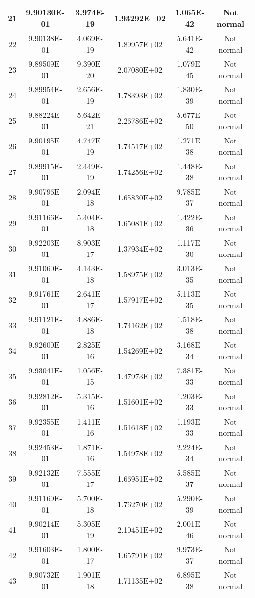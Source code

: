 \begin{table}[h]
\begin{tabular}{|c|c|c|c|c|c|}
		21 & 9.90130E-01 & 3.974E-19 & 1.93292E+02 & 1.065E-42 & Not normal\\\hline
		22 & 9.90138E-01 & 4.069E-19 & 1.89957E+02 & 5.641E-42 & Not normal\\\hline
		23 & 9.89509E-01 & 9.390E-20 & 2.07080E+02 & 1.079E-45 & Not normal\\\hline
		24 & 9.89954E-01 & 2.656E-19 & 1.78393E+02 & 1.830E-39 & Not normal\\\hline
		25 & 9.88224E-01 & 5.642E-21 & 2.26786E+02 & 5.677E-50 & Not normal\\\hline
		26 & 9.90195E-01 & 4.747E-19 & 1.74517E+02 & 1.271E-38 & Not normal\\\hline
		27 & 9.89915E-01 & 2.449E-19 & 1.74256E+02 & 1.448E-38 & Not normal\\\hline
		28 & 9.90796E-01 & 2.094E-18 & 1.65830E+02 & 9.785E-37 & Not normal\\\hline
		29 & 9.91166E-01 & 5.404E-18 & 1.65081E+02 & 1.422E-36 & Not normal\\\hline
		30 & 9.92203E-01 & 8.903E-17 & 1.37934E+02 & 1.117E-30 & Not normal\\\hline
		31 & 9.91060E-01 & 4.143E-18 & 1.58975E+02 & 3.013E-35 & Not normal\\\hline
		32 & 9.91761E-01 & 2.641E-17 & 1.57917E+02 & 5.113E-35 & Not normal\\\hline
		33 & 9.91121E-01 & 4.886E-18 & 1.74162E+02 & 1.518E-38 & Not normal\\\hline
		34 & 9.92600E-01 & 2.825E-16 & 1.54269E+02 & 3.168E-34 & Not normal\\\hline
		35 & 9.93041E-01 & 1.056E-15 & 1.47973E+02 & 7.381E-33 & Not normal\\\hline
		36 & 9.92812E-01 & 5.315E-16 & 1.51601E+02 & 1.203E-33 & Not normal\\\hline
		37 & 9.92355E-01 & 1.411E-16 & 1.51618E+02 & 1.193E-33 & Not normal\\\hline
		38 & 9.92453E-01 & 1.871E-16 & 1.54978E+02 & 2.224E-34 & Not normal\\\hline
		39 & 9.92132E-01 & 7.555E-17 & 1.66951E+02 & 5.585E-37 & Not normal\\\hline
		40 & 9.91169E-01 & 5.700E-18 & 1.76270E+02 & 5.290E-39 & Not normal\\\hline
		41 & 9.90214E-01 & 5.305E-19 & 2.10451E+02 & 2.001E-46 & Not normal\\\hline
		42 & 9.91603E-01 & 1.800E-17 & 1.65791E+02 & 9.973E-37 & Not normal\\\hline
		43 & 9.90732E-01 & 1.901E-18 & 1.71135E+02 & 6.895E-38 & Not normal\\\hline

\end{tabular}
\end{table}
